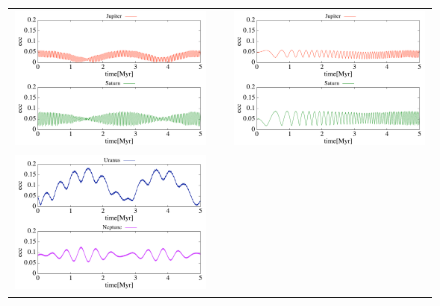\documentclass[11pt,a4paper,oneside,onecolumn]{jreport}
\begin{document}
\begin{figure}[H]
\begin{tabular}{ccc}
\begin{minipage}[t]{0.45\hsize}
\centering
\includegraphics[width=8cm]{./image/NoMove_ecc_5Myr_JUPSAT.pdf}
\end{minipage} &
\begin{minipage}[t]{0.1\hsize}
\end{minipage} &
\begin{minipage}[t]{0.45\hsize}
\centering
\includegraphics[width=8cm]{./image/Move500kyr_ecc_5Myr_JUPSAT.pdf}
\end{minipage}\\
\begin{minipage}[t]{0.45\hsize}
\centering
\includegraphics[width=8cm]{./image/NoMove_ecc_5Myr_URANEP.pdf}
\end{minipage} &

\end{tabular}
\end{figure}
\end{document}

